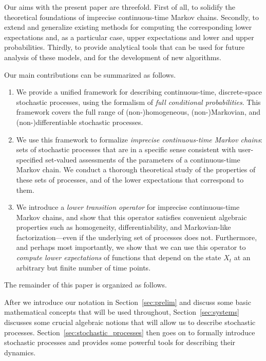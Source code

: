 \documentclass[10pt,a4paper]{paper}
\theoremstyle{definition}
\begin{document}
Our aims with the present paper are threefold. First of all, to solidify the theoretical foundations of imprecise continuous-time Markov chains. Secondly, to extend and generalize existing methods for computing the corresponding lower expectations and, as a particular case, upper expectations and lower and upper probabilities. Thirdly, to provide analytical tools that can be used for future analysis of these models, and for the development of new algorithms.

Our main contributions can be summarized as follows.
\begin{enumerate}
\item We provide a unified framework for describing continuous-time, discrete-space stochastic processes, using the formalism of \emph{full conditional probabilities}. This framework covers the full range of (non-)homogeneous, (non-)Markovian, and (non-)differentiable stochastic processes.
\item We use this framework to formalize \emph{imprecise continuous-time Markov chains}: sets of stochastic processes that are in a specific sense consistent with user-specified set-valued assessments of the parameters of a continuous-time Markov chain. We conduct a thorough theoretical study of the properties of these sets of processes, and of the lower expectations that correspond to them. 
\item We introduce a \emph{lower transition operator} for imprecise continuous-time Markov chains, and show that this operator satisfies convenient algebraic properties such as homogeneity, differentiability, and Markovian-like factorization---even if the underlying set of processes does not. Furthermore, and perhaps most importantly, we show that we can use this operator to \emph{compute lower expectations} of functions that depend on the state $X_t$ at an arbitrary but finite number of time points.%
\end{enumerate}

The remainder of this paper is organized as follows. 

After we  introduce our notation in Section~\ref{sec:prelim} and discuss some basic mathematical concepts that will be used throughout, Section~\ref{sec:systems} discusses some crucial algebraic notions that will allow us to describe stochastic processes. Section~\ref{sec:stochastic_processes} then goes on to formally introduce stochastic processes and provides some powerful tools for describing their dynamics.
\end{document}
